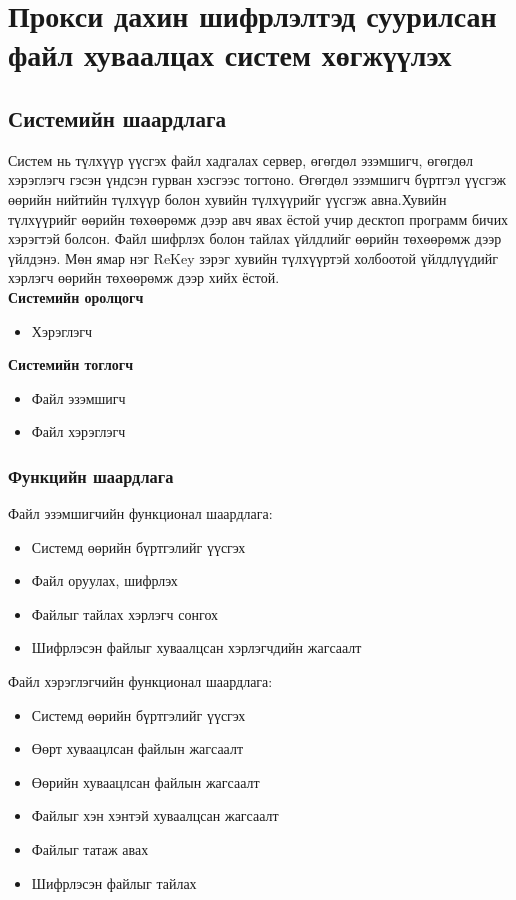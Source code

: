 
\chapter{Прокси дахин шифрлэлтэд суурилсан файл хуваалцах систем хөгжүүлэх}

\label{Chapter3} %
\pagecolor{white}

\section{Системийн шаардлага}
Систем нь түлхүүр үүсгэх файл хадгалах сервер, өгөгдөл эзэмшигч, өгөгдөл хэрэглэгч гэсэн үндсэн гурван хэсгээс тогтоно. Өгөгдөл эзэмшигч бүртгэл үүсгэж өөрийн нийтийн түлхүүр болон хувийн түлхүүрийг үүсгэж авна.Хувийн түлхүүрийг өөрийн төхөөрөмж дээр авч явах ёстой учир десктоп программ бичих хэрэгтэй болсон. Файл шифрлэх болон тайлах үйлдлийг өөрийн төхөөрөмж дээр үйлдэнэ. Мөн ямар нэг ReKey зэрэг хувийн түлхүүртэй холбоотой үйлдлүүдийг хэрлэгч өөрийн төхөөрөмж дээр хийх ёстой.\\

\textbf{Системийн оролцогч}
\begin{itemize}
    \item Хэрэглэгч
\end{itemize}

\textbf{Системийн тоглогч}
\begin{itemize}
    \item Файл эзэмшигч
    \item Файл хэрэглэгч
\end{itemize}

\subsection*{Функцийн шаардлага}
Файл эзэмшигчийн функционал шаардлага:
\begin{itemize}
    \item Системд өөрийн бүртгэлийг үүсгэх
    \item Файл оруулах, шифрлэх
    \item Файлыг тайлах хэрлэгч сонгох
    \item Шифрлэсэн файлыг хуваалцсан хэрлэгчдийн жагсаалт
\end{itemize}
Файл хэрэглэгчийн функционал шаардлага:
\begin{itemize}
    \item Системд өөрийн бүртгэлийг үүсгэх
    \item Өөрт хуваацлсан файлын жагсаалт
    \item Өөрийн хуваацлсан файлын жагсаалт
    \item Файлыг хэн хэнтэй хуваалцсан жагсаалт
    \item Файлыг татаж авах
    \item Шифрлэсэн файлыг тайлах
\end{itemize}

